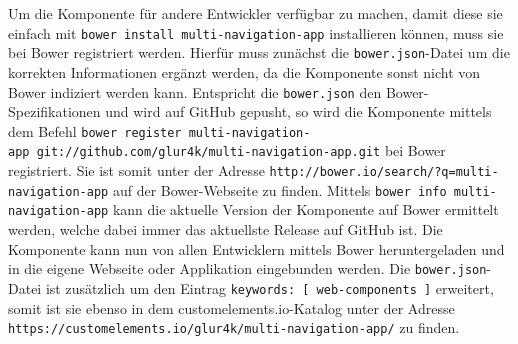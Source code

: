 Um die Komponente für andere Entwickler verfügbar zu machen, damit diese sie einfach mit \texttt{bower\ install\ multi-navigation-app} installieren können, muss sie bei Bower registriert werden. Hierfür muss zunächst die \texttt{bower.json}-Datei um die korrekten Informationen ergänzt werden, da die Komponente sonst nicht von Bower indiziert werden kann. Entspricht die \texttt{bower.json} den Bower-Spezifikationen und wird auf GitHub gepusht, so wird die Komponente mittels dem Befehl \texttt{bower\ register\ multi-navigation-app\ git://github.com/glur4k/multi-navigation-app.git} bei Bower registriert. Sie ist somit unter der Adresse \texttt{http://bower.io/search/?q=multi-navigation-app} auf der Bower-Webseite zu finden. Mittels \texttt{bower\ info\ multi-navigation-app} kann die aktuelle Version der Komponente auf Bower ermittelt werden, welche dabei immer das aktuellste Release auf GitHub ist. Die Komponente kann nun von allen Entwicklern mittels Bower heruntergeladen und in die eigene Webseite oder Applikation eingebunden werden. Die \texttt{bower.json}-Datei ist zusätzlich um den Eintrag \texttt{\dq keywords\dq:\ {[}\ \dq web-components\dq\ {]}} erweitert, somit ist sie ebenso in dem customelements.io-Katalog unter der Adresse \texttt{https://customelements.io/glur4k/multi-navigation-app/} zu finden.
